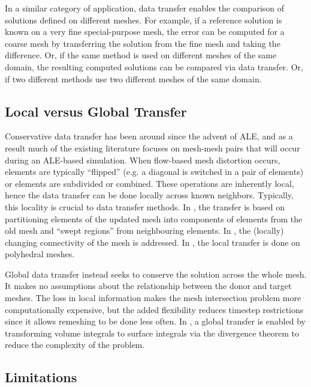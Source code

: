 In a similar category of application, data transfer enables the comparison
of solutions defined on different meshes. For example, if a reference
solution is known on a very fine special-purpose mesh, the error can be
computed for a coarse mesh by transferring the solution from the fine
mesh and taking the difference. Or, if the same method is used on
different meshes of the same domain, the resulting computed solutions can
be compared via data transfer. Or, if two different methods use two
different meshes of the same domain.

\subsection{Local versus Global Transfer}

Conservative data transfer has been around since the advent of ALE,
and as a result much of the existing literature focuses on mesh-mesh
pairs that will occur during an ALE-based simulation. When flow-based
mesh distortion occurs, elements are typically ``flipped'' (e.g. a
diagonal is switched in a pair of elements) or elements are subdivided
or combined. These operations are inherently local, hence the data
transfer can be done locally across known neighbors. Typically, this
locality is crucial to data transfer methods. In \cite{Margolin2003},
the transfer is based on partitioning elements of the updated mesh into
components of elements from the old mesh and ``swept regions'' from
neighbouring elements. In \cite{Kucharik2008}, the (locally) changing
connectivity of the mesh is addressed. In \cite{Garimella2007}, the
local transfer is done on polyhedral meshes.

Global data transfer instead seeks to conserve the solution across
the whole mesh. It makes no assumptions about the relationship between
the donor and target meshes. The loss in local information makes
the mesh intersection problem more computationally expensive, but the
added flexibility reduces timestep restrictions since it allows remeshing
to be done less often. In \cite{Dukowicz1984, Dukowicz1987}, a global
transfer is enabled by transforming volume integrals to surface integrals
via the divergence theorem to reduce the complexity of the problem.

\subsection{Limitations}

